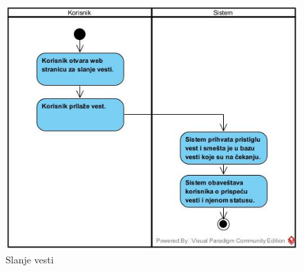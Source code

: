 \documentclass{article}
\begin{document}
\begin{figure}[htbp!]
    \centering
    \includegraphics[scale=0.7]{Slanje_vesti.jpg}
    \caption{Slanje vesti}
    \label{slk:dtp}
\end{figure}

\newpage
\end{document}
